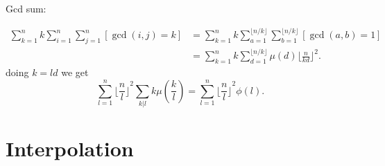 Gcd sum:

\begin{align*}
        \sum_{k=1}^n k \sum_{i=1}^n \sum_{j=1}^n [\gcd(i,j)=k] &= \sum_{k=1}^n k \sum_{a=1}^{\lfloor n/k\rfloor}\sum_{b=1}^{\lfloor n/k \rfloor} [\gcd(a, b) = 1] \\
        &= \sum_{k=1}^n k \sum_{d=1}^{\lfloor n/k \rfloor} \mu(d) \lfloor \frac{n}{kd}\rfloor^2 .
\end{align*}
doing $k = ld$ we get
 \[\sum_{l=1}^n \lfloor{\frac{n}{l}\rfloor}^2 \sum_{k|l} k \mu(\frac{k}{l}) = \sum_{l=1}^n \lfloor{\frac{n}{l}\rfloor}^2 \phi(l).\]
 
\section{Interpolation}
    
